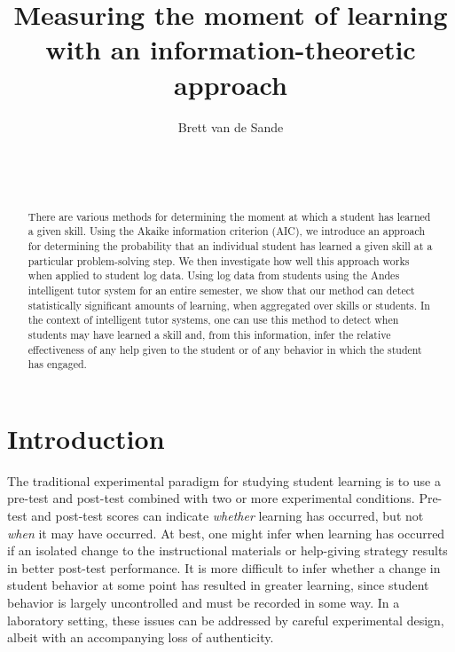 \documentclass{edm_template}
\begin{document}
\title{Measuring the moment of learning with an information-theoretic approach}
\author{
\alignauthor
      Brett van de Sande\\
       \\
       \\
       \\
}

\maketitle
\begin{abstract}
There are various methods for determining the moment at which a
student has learned a given skill.  Using the Akaike information
criterion (AIC), we introduce an approach for determining the
probability that an individual student has learned a given skill at a
particular problem-solving step.  We then investigate how well this
approach works when applied to student log data.  Using log data from
students using the Andes intelligent tutor system for an entire
semester, we show that our method can detect statistically significant
amounts of learning, when aggregated over skills or students.  In the
context of intelligent tutor systems, one can use this method to
detect when students may have learned a skill and, from this
information, infer the relative effectiveness of any help given to the
student or of any behavior in which the student has engaged.
\end{abstract}



\section{Introduction}

%
%


The traditional experimental paradigm for studying student learning
is to use a pre-test and post-test combined with two or more experimental
conditions.  Pre-test and post-test scores can indicate {\em whether}
learning has occurred, but not {\em when} it may have occurred.  
At best, one might infer when learning has occurred if an isolated change to 
the instructional materials or help-giving strategy results in better
post-test performance.  
It is more difficult to infer whether a change in student behavior at
some point has resulted in greater learning, since student behavior is 
largely uncontrolled and must be recorded in some way.
In a laboratory setting, these issues can be addressed by careful
experimental design, albeit with an accompanying loss of authenticity.
\end{document}
